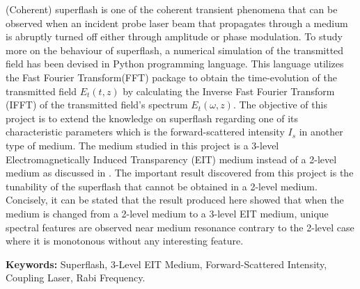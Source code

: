 
(Coherent) superflash is one of the coherent transient phenomena that can be observed when an incident probe laser beam that propagates through a medium is abruptly turned off either through amplitude or phase modulation. To study more on the behaviour of superflash, a numerical simulation of the transmitted field has been devised in Python programming language. This language utilizes the Fast Fourier Transform(FFT) package to obtain the time-evolution of the transmitted field $E_{t}(t, z)$ by calculating the Inverse Fast Fourier Transform (IFFT) of the transmitted field's spectrum $E_{t}(\omega, z)$. The objective of this project is to extend the knowledge on superflash regarding one of its characteristic parameters which is the forward-scattered intensity $I_{s}$ in another type of medium. The medium studied in this project is a 3-level Electromagnetically Induced Transparency (EIT) medium instead of a 2-level medium as discussed in \cite{Kwong2014}. The important result discovered from this project is the tunability of the superflash that cannot be obtained in a 2-level medium. Concisely, it can be stated that the result produced here showed that when the medium is changed from a 2-level medium to a 3-level EIT medium, unique spectral features are observed near medium resonance contrary to the 2-level case where it is monotonous without any interesting feature.

\textbf{Keywords: } Superflash, 3-Level EIT Medium, Forward-Scattered Intensity, Coupling Laser, Rabi Frequency.
